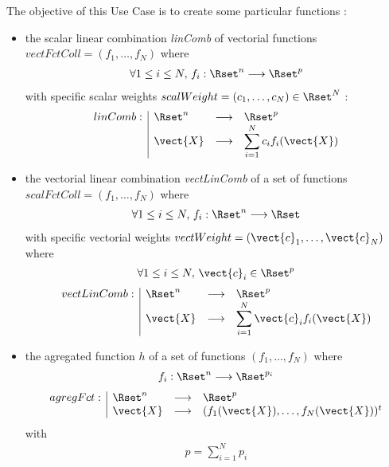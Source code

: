 The objective of this Use Case is to create some particular functions :
\begin{itemize}
\item the scalar linear combination \textit{linComb} of vectorial functions $vectFctColl = (f_1, \hdots, f_N)$ where
  \begin{align*}
    \forall 1 \leq i \leq N, \,     f_i : \Rset^n \longrightarrow \Rset^{p}
  \end{align*}
  with specific scalar weights $scalWeight = (c_1, \hdots, c_N)\in \Rset^N $ :
  \begin{align*}
    \begin{array}{l|lcl}
      linComb : & \Rset^n & \longrightarrow & \Rset^{p} \\
      &  \vect{X} & \longrightarrow & \displaystyle \sum_{i=1}^N c_if_i (\vect{X})
    \end{array}
  \end{align*}


\item the vectorial linear combination \textit{vectLinComb} of a set of  functions $scalFctColl = (f_1, \hdots, f_N)$ where
  \begin{align*}
    \forall 1 \leq i \leq N, \,     f_i : \Rset^n \longrightarrow \Rset
  \end{align*}
  with specific vectorial weights $vectWeight = (\vect {c}_1, \hdots, \vect{c}_N)$  where
  \begin{align*}
    \forall 1 \leq i \leq N, \,   \vect{c}_i \in \Rset^p
  \end{align*}
  \begin{align*}
    \begin{array}{l|lcl}
      vectLinComb : & \Rset^n & \longrightarrow & \Rset^{p} \\
      &  \vect{X} & \longrightarrow & \displaystyle \sum_{i=1}^N \vect{c}_if_i (\vect{X})
    \end{array}
  \end{align*}

\item the agregated function $h$ of a set of functions $(f_1, \hdots, f_N)$ where
  \begin{align*}
    f_i : \Rset^n \longrightarrow \Rset^{p_i}
  \end{align*}
  \begin{align*}
    \begin{array}{l|lcl}
      agregFct : & \Rset^n & \longrightarrow & \Rset^{p} \\
      &  \vect{X} & \longrightarrow & (f_1(\vect{X}), \hdots, f_N(\vect{X}))^t
    \end{array}
  \end{align*}
  with
  \begin{align*}
    p = \displaystyle \sum_{i=1}^N p_i
  \end{align*}


\end{itemize}
